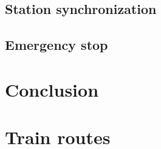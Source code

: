 \documentclass{article}
\begin{document}
    \subsection*{Station synchronization}

    \subsection*{Emergency stop}

    \section{Conclusion}

    \appendix

    \section{Train routes}
\end{document}
